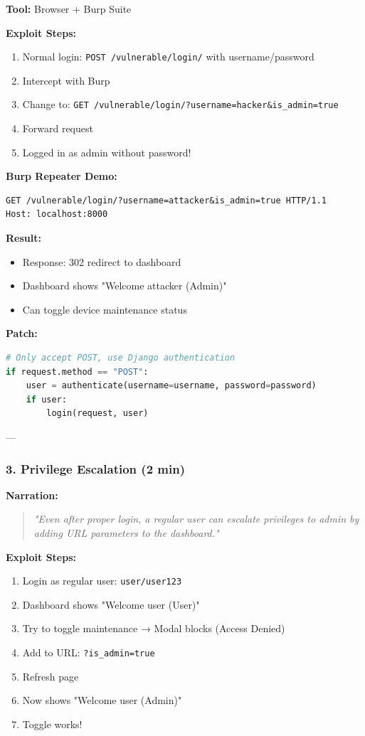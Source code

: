 \documentclass[12pt,a4paper]{article}
\begin{document}
\textbf{Tool:} Browser + Burp Suite

\textbf{Exploit Steps:}
\begin{enumerate}
    \item Normal login: \texttt{POST /vulnerable/login/} with username/password
    \item Intercept with Burp
    \item Change to: \texttt{GET /vulnerable/login/?username=hacker\&is\_admin=true}
    \item Forward request
    \item Logged in as admin without password!
\end{enumerate}

\textbf{Burp Repeater Demo:}
\begin{lstlisting}
GET /vulnerable/login/?username=attacker&is_admin=true HTTP/1.1
Host: localhost:8000
\end{lstlisting}

\textbf{Result:}
\begin{itemize}
    \item Response: 302 redirect to dashboard
    \item Dashboard shows "Welcome attacker (Admin)"
    \item Can toggle device maintenance status
\end{itemize}

\textbf{Patch:}
\begin{lstlisting}[language=Python]
# Only accept POST, use Django authentication
if request.method == "POST":
    user = authenticate(username=username, password=password)
    if user:
        login(request, user)
\end{lstlisting}

---

\subsubsection{3. Privilege Escalation (2 min)}

\textbf{Narration:}
\begin{quote}
\textit{"Even after proper login, a regular user can escalate privileges to admin by adding URL parameters to the dashboard."}
\end{quote}

\textbf{Exploit Steps:}
\begin{enumerate}
    \item Login as regular user: \texttt{user/user123}
    \item Dashboard shows "Welcome user (User)"
    \item Try to toggle maintenance → Modal blocks (Access Denied)
    \item Add to URL: \texttt{?is\_admin=true}
    \item Refresh page
    \item Now shows "Welcome user (Admin)"
    \item Toggle works!
\end{enumerate}
\end{document}
